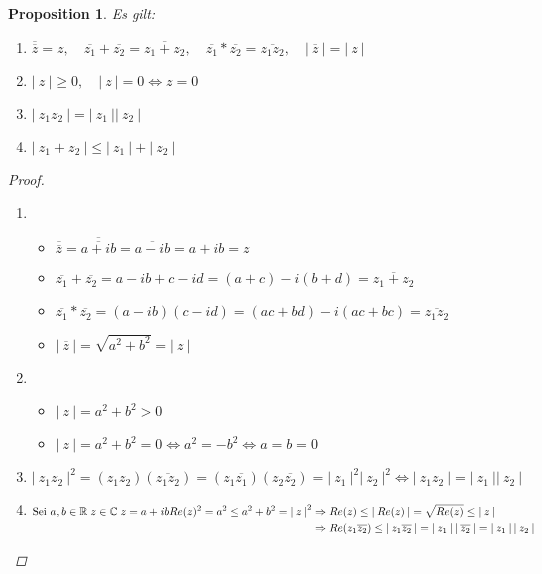 \documentclass[a4paper,titlepage,oneside]{article}
\def\C{\ensuremath{\mathbb{C}} }
\def\R{\ensuremath{\mathbb{R}} }
\def\im{\ensuremath{\mathit{i}} }
\def\sp{\hspace{0,1cm}}
\newcommand{\abs}[1]{\ensuremath{\left|\:#1\:\right|}}
\theoremstyle{thmstyle}
\newtheorem{prop}[satz]{Proposition}
\begin{document}
\begin{prop}
Es gilt:
\begin{enumerate}[label=(\roman*)]
\item \( \overline{\overline{z}} = z, \quad \overline{z_1} + \overline{z_2} = \overline{z_1 + z_2}, \quad \overline{z_1}* \overline{z_2} = \overline{z_1  z_2}, \quad \abs{\overline{z}} = \abs{z} \)
\item \( \abs{z} \ge 0, \quad \abs{z} = 0 \Leftrightarrow z = 0\)
\item \(\abs{z_1 z_2} = \abs{z_1} \abs{z_2}\)
\item \(\abs{z_1 + z_2} \le \abs{z_1} + \abs{z_2}\)
\end{enumerate}
\begin{proof} \sp
\begin{enumerate}[label=(\roman*)]
\item
\begin{itemize}
\item \(\overline{\overline{z}} = \overline{\overline{a + \im b}} = \overline{a - \im b} = a + \im b = z \)
\item \(\overline{z_1} + \overline{z_2} = a - \im b + c - \im d = (a + c) - \im (b + d) = \overline{z_1 + z_2} \)
\item \(\overline{z_1} * \overline{z_2} = (a - \im b) (c - \im d) = (ac + bd) - \im (ac + bc) = \overline{z_1  z_2} \)
\item \( \abs{\overline{z}} = \sqrt{a^2 + b^2} = \abs{z}\)
\end{itemize}
\item
\begin{itemize}
\item \(\abs{z} = a^2 + b^2 > 0 \)
\item \(\abs{z} = a^2 + b^2 = 0 \Leftrightarrow a^2 = - b^2 \Leftrightarrow a = b = 0 \)
\end{itemize}
\item \(\abs{z_1 z_2}^2 = (z_1 z_2)(\overline{z_1 z_2}) = (z_1\overline{z_1})(z_2\overline{z_2}) = \abs{z_1}^2\abs{z_2}^2 \Leftrightarrow \abs{z_1 z_2} = \abs{z_1}\abs{z_2} \)
\item  \begin{math}
\text{Sei }a, b \in \R \sp z \in \C \sp z = a + \im b \\
\begin{aligned}[t]
Re(z)^2 = a^2 \le a^2 + b^2 = \abs{z}^2 &\Rightarrow Re(z) \le \abs{Re(z)} = \sqrt{Re(z)} \le \abs{z} \\
&\Rightarrow Re(z_1\overline{z_2}) \le \abs{z_1\overline{z_2}} = \abs{z_1}\abs{\overline{z_2}} = \abs{z_1}\abs{z_2} \\

\end{aligned}
\end{math}
\end{enumerate}
\end{proof}
\end{prop}
\end{document}
